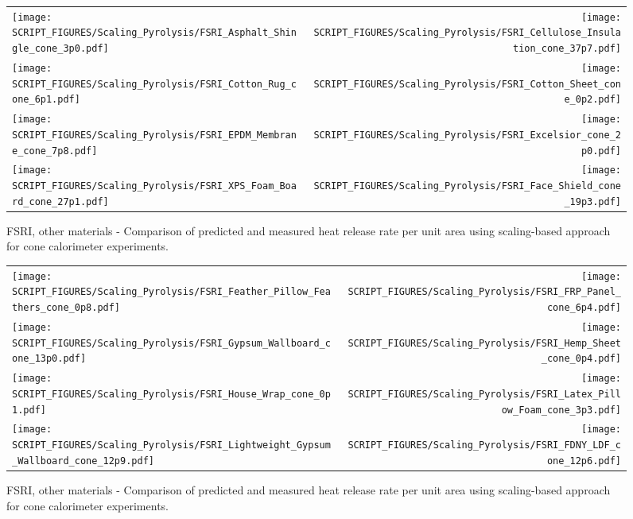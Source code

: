 \begin{figure}[p]
\begin{tabular*}{\textwidth}{l@{\extracolsep{\fill}}r}
\texttt{[image: SCRIPT\_FIGURES/Scaling\_Pyrolysis/FSRI\_Asphalt\_Shingle\_cone\_3p0.pdf]} &
\texttt{[image: SCRIPT\_FIGURES/Scaling\_Pyrolysis/FSRI\_Cellulose\_Insulation\_cone\_37p7.pdf]} \\
\texttt{[image: SCRIPT\_FIGURES/Scaling\_Pyrolysis/FSRI\_Cotton\_Rug\_cone\_6p1.pdf]} &
\texttt{[image: SCRIPT\_FIGURES/Scaling\_Pyrolysis/FSRI\_Cotton\_Sheet\_cone\_0p2.pdf]} \\
\texttt{[image: SCRIPT\_FIGURES/Scaling\_Pyrolysis/FSRI\_EPDM\_Membrane\_cone\_7p8.pdf]} &
\texttt{[image: SCRIPT\_FIGURES/Scaling\_Pyrolysis/FSRI\_Excelsior\_cone\_2p0.pdf]} \\
\texttt{[image: SCRIPT\_FIGURES/Scaling\_Pyrolysis/FSRI\_XPS\_Foam\_Board\_cone\_27p1.pdf]} &
\texttt{[image: SCRIPT\_FIGURES/Scaling\_Pyrolysis/FSRI\_Face\_Shield\_cone\_19p3.pdf]} \\
\end{tabular*}
\caption[HRRPUA of FSRI Materials using scaling model, other materials]
{FSRI, other materials - Comparison of predicted and measured heat release rate per unit area using scaling-based approach for cone calorimeter experiments.}
\label{FSRI_Materials_HRR_Others1}
\end{figure}

\begin{figure}[p]
\begin{tabular*}{\textwidth}{l@{\extracolsep{\fill}}r}
\texttt{[image: SCRIPT\_FIGURES/Scaling\_Pyrolysis/FSRI\_Feather\_Pillow\_Feathers\_cone\_0p8.pdf]} &
\texttt{[image: SCRIPT\_FIGURES/Scaling\_Pyrolysis/FSRI\_FRP\_Panel\_cone\_6p4.pdf]} \\
\texttt{[image: SCRIPT\_FIGURES/Scaling\_Pyrolysis/FSRI\_Gypsum\_Wallboard\_cone\_13p0.pdf]} &
\texttt{[image: SCRIPT\_FIGURES/Scaling\_Pyrolysis/FSRI\_Hemp\_Sheet\_cone\_0p4.pdf]} \\
\texttt{[image: SCRIPT\_FIGURES/Scaling\_Pyrolysis/FSRI\_House\_Wrap\_cone\_0p1.pdf]} &
\texttt{[image: SCRIPT\_FIGURES/Scaling\_Pyrolysis/FSRI\_Latex\_Pillow\_Foam\_cone\_3p3.pdf]} \\
\texttt{[image: SCRIPT\_FIGURES/Scaling\_Pyrolysis/FSRI\_Lightweight\_Gypsum\_Wallboard\_cone\_12p9.pdf]} &
\texttt{[image: SCRIPT\_FIGURES/Scaling\_Pyrolysis/FSRI\_FDNY\_LDF\_cone\_12p6.pdf]} \\
\end{tabular*}
\caption[HRRPUA of FSRI Materials using scaling model, others materials]
{FSRI, other materials - Comparison of predicted and measured heat release rate per unit area using scaling-based approach for cone calorimeter experiments.}
\label{FSRI_Materials_HRR_Others2}
\end{figure}

